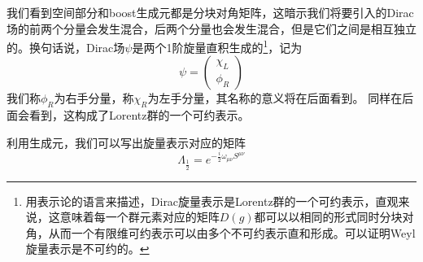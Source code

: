 我们看到空间部分和boost生成元都是分块对角矩阵，这暗示我们将要引入的Dirac场的前两个分量会发生混合，后两个分量也会发生混合，但是它们之间是相互独立的。换句话说，Dirac场$\psi$是两个1阶旋量直积生成的\footnote{用表示论的语言来描述，Dirac旋量表示是Lorentz群的一个可约表示，直观来说，这意味着每一个群元素对应的矩阵$D(g)$都可以以相同的形式同时分块对角，从而一个有限维可约表示可以由多个不可约表示直和形成。可以证明Weyl旋量表示是不可约的。}，记为
\begin{equation}
   \psi=\left(\begin{array}{cc}
        \chi_{L}  \\
         \phi_{R}
   \end{array}\right) 
\end{equation}
我们称$\phi_{R}$为右手分量，称$\chi_{R}$为左手分量，其名称的意义将在后面看到。
同样在后面会看到，这构成了Lorentz群的一个可约表示。

利用生成元，我们可以写出旋量表示对应的矩阵
\begin{equation}
\label{chap4spinor}
    \Lambda_{\frac{1}{2}}=e^{-\frac{i}{2}\omega_{\mu\nu}S^{\mu\nu}}
\end{equation}

